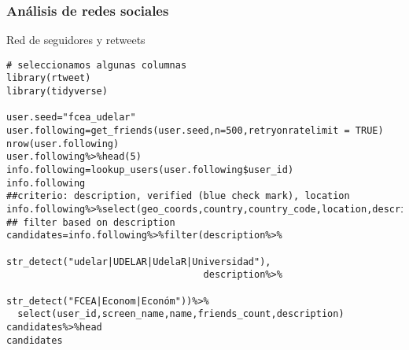 \documentclass[11pt]{beamer}
\begin{document}
\begin{frame}[fragile]
 \frametitle{Análisis de redes sociales} 
Red de seguidores y retweets
\begin{verbatim}# seleccionamos algunas columnas
library(rtweet)
library(tidyverse)

user.seed="fcea_udelar"
user.following=get_friends(user.seed,n=500,retryonratelimit = TRUE)
nrow(user.following)
user.following%>%head(5)
info.following=lookup_users(user.following$user_id)
info.following
##criterio: description, verified (blue check mark), location
info.following%>%select(geo_coords,country,country_code,location,description)%>%lat_lng()
## filter based on description
candidates=info.following%>%filter(description%>%
                                     str_detect("udelar|UDELAR|UdelaR|Universidad"),
                                   description%>%
                                     str_detect("FCEA|Econom|Económ"))%>%
  select(user_id,screen_name,name,friends_count,description)
candidates%>%head
candidates
    \end{verbatim}
\end{frame}
\end{document}
